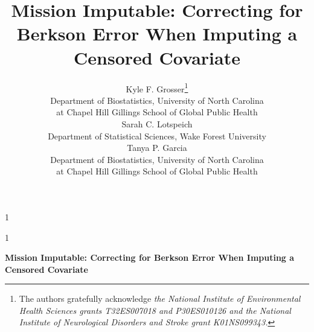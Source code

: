 \documentclass[12pt]{article}
\newcommand{\blind}{1}
\begin{document}
%

\def\spacingset#1{\renewcommand{\baselinestretch}%
{#1}\small\normalsize} \spacingset{1}



\blind
{
  \title{\bf Mission Imputable: Correcting for Berkson Error When Imputing a Censored Covariate}
  \author{Kyle F. Grosser\thanks{
    The authors gratefully acknowledge \textit{the National Institute of Environmental Health Sciences grants T32ES007018 and P30ES010126 and the National Institute of Neurological Disorders and Stroke grant K01NS099343.}}\hspace{.2cm}\\
    Department of Biostatistics, University of North Carolina \\ at Chapel Hill Gillings School of Global Public Health\\
    Sarah C. Lotspeich \\
    Department of Statistical Sciences, Wake Forest University \\
    Tanya P. Garcia \\
    Department of Biostatistics, University of North Carolina \\ at Chapel Hill Gillings School of Global Public Health}
  \maketitle
} \fi

\blind
{
  \bigskip
  \bigskip
  \bigskip
  \begin{center}
    {\LARGE\bf Mission Imputable: Correcting for Berkson Error When Imputing a Censored Covariate}
\end{center}
  \medskip
} \fi
\end{document}
